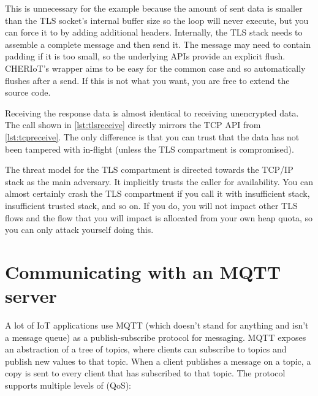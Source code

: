 This is unnecessary for the example because the amount of sent data is smaller than the TLS socket's internal buffer size so the loop will never execute, but you can force it to by adding additional headers.
Internally, the TLS stack needs to assemble a complete message and then send it.
The message may need to contain padding if it is too small, so the underlying APIs provide an explicit flush.
CHERIoT's wrapper aims to be easy for the common case and so automatically flushes after a send.
If this is not what you want, you are free to extend the source code.

\codelisting[filename=examples/tls/https.cc,marker=send,label=lst:tlssend,caption="Sending data over a TLS connection."]{}

Receiving the response data is almost identical to receiving unencrypted data.
The call shown in \ref{lst:tlsreceive} directly mirrors the TCP API from \ref{lst:tcpreceive}.
The only difference is that you can trust that the data has not been tampered with in-flight (unless the TLS compartment is compromised).

\codelisting[filename=examples/tls/https.cc,marker=receive,label=lst:tlsreceive,caption="Receiving data over a TLS connection."]{}

\begin{caution}
The threat model for the TLS compartment is directed towards the TCP/IP stack as the main adversary.
It implicitly trusts the caller for availability.
You can almost certainly crash the TLS compartment if you call it with insufficient stack, insufficient trusted stack, and so on.
If you do, you will not impact other TLS flows and the flow that you will impact is allocated from your own heap quota, so you can only attack yourself doing this.
\end{caution}

\section[label=mqtt]{Communicating with an MQTT server}

A lot of IoT applications use MQTT (which doesn't stand for anything and isn't a message queue) as a publish-subscribe protocol for messaging.
MQTT exposes an abstraction of a tree of topics, where clients can subscribe to topics and publish new values to that topic.
When a client publishes a message on a topic, a copy is sent to every client that has subscribed to that topic.
The protocol supports multiple levels of  (QoS):

